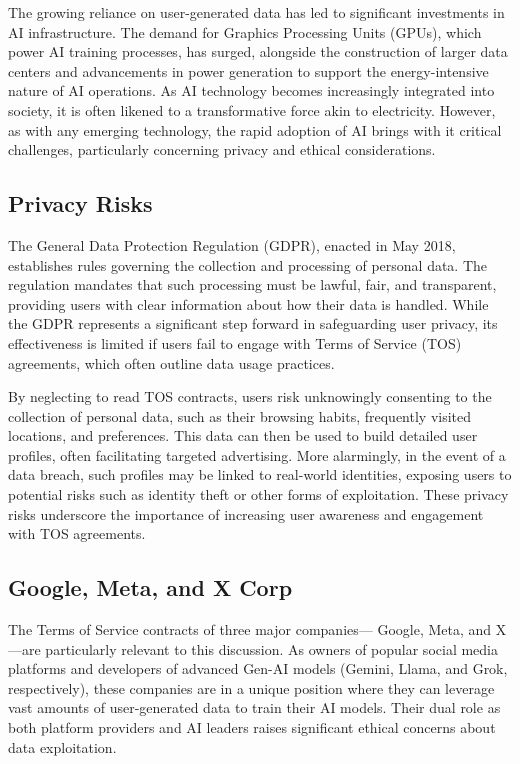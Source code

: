 \documentclass[sigconf, nonacm]{acmart}
\begin{document}
The growing reliance on user-generated data has led to significant investments in AI infrastructure. The demand for Graphics Processing Units (GPUs), which power AI training processes, has surged, alongside the construction of larger data centers and advancements in power generation to support the energy-intensive nature of AI operations. As AI technology becomes increasingly integrated into society, it is often likened to a transformative force akin to electricity. However, as with any emerging technology, the rapid adoption of AI brings with it critical challenges, particularly concerning privacy and ethical considerations.

\subsection{Privacy Risks}
The \cite{gdprArchives} General Data Protection Regulation (GDPR), enacted in May 2018, establishes rules governing the collection and processing of personal data. The regulation mandates that such processing must be lawful, fair, and transparent, providing users with clear information about how their data is handled. While the GDPR represents a significant step forward in safeguarding user privacy, its effectiveness is limited if users fail to engage with Terms of Service (TOS) agreements, which often outline data usage practices.

By neglecting to read TOS contracts, users risk unknowingly consenting to the collection of personal data, such as their browsing habits, frequently visited locations, and preferences. This data can then be used to build detailed user profiles, often facilitating targeted advertising. More alarmingly, in the event of a data breach, such profiles may be linked to real-world identities, exposing users to potential risks such as identity theft or other forms of exploitation. These privacy risks underscore the importance of increasing user awareness and engagement with TOS agreements.

\subsection{Google, Meta, and X Corp}
The Terms of Service contracts of three major companies—\cite{googleTerms} Google, \cite{metaTerms} Meta, and \cite{xTerms} X—are particularly relevant to this discussion. As owners of popular social media platforms and developers of advanced Gen-AI models (Gemini, Llama, and Grok, respectively), these companies are in a unique position where they can leverage vast amounts of user-generated data to train their AI models. Their dual role as both platform providers and AI leaders raises significant ethical concerns about data exploitation.
\end{document}
